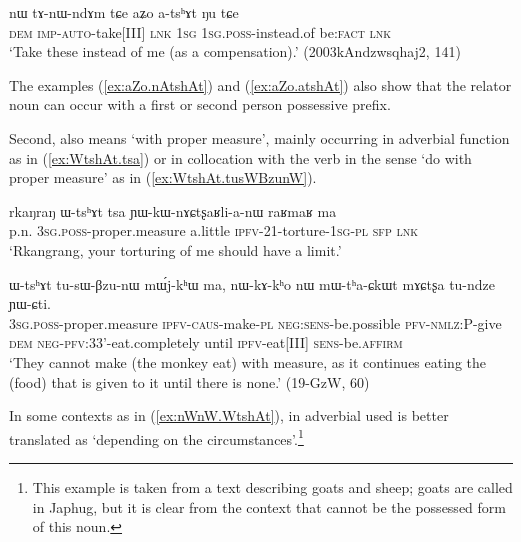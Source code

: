 \begin{exe}
\ex \label{ex:aZo.atshAt}
\gll nɯ tɤ-nɯ-ndɤm tɕe aʑo a-tsʰɤt ŋu tɕe \\
\textsc{dem} \textsc{imp}-\textsc{auto}-take[III] \textsc{lnk} \textsc{1sg} \textsc{1sg}.\textsc{poss}-instead.of be:\textsc{fact} \textsc{lnk} \\
\glt `Take these instead of me (as a compensation).' (2003kAndzwsqhaj2, 141)
\end{exe}

The examples (\ref{ex:aZo.nAtshAt}) and (\ref{ex:aZo.atshAt}) also show that the relator noun  can occur with a first or second person possessive prefix.

Second,  also means `with proper measure', mainly occurring in adverbial function as in (\ref{ex:WtshAt.tsa}) or in collocation with the verb  in the sense `do with proper measure' as in (\ref{ex:WtshAt.tusWBzunW}). 

\begin{exe}
\ex \label{ex:WtshAt.tsa}
\gll rkaŋraŋ ɯ-tsʰɤt tsa ɲɯ-kɯ-nɤɕtʂaʁli-a-nɯ raʁmaʁ ma  \\
p.n. \textsc{3sg}.\textsc{poss}-proper.measure a.little \textsc{ipfv}-2\fl{}1-torture-\textsc{1sg}-\textsc{pl} \textsc{sfp} \textsc{lnk}  \\
\glt `Rkangrang, your torturing of me should have a limit.' 
\end{exe}

\begin{exe}
\ex \label{ex:WtshAt.tusWBzunW}
\gll ɯ-tsʰɤt tu-sɯ-βzu-nɯ mɯ́j-kʰɯ ma, nɯ-kɤ-kʰo nɯ mɯ-tʰa-ɕkɯt mɤɕtʂa tu-ndze ɲɯ-ɕti. \\
\textsc{3sg}.\textsc{poss}-proper.measure \textsc{ipfv}-\textsc{caus}-make-\textsc{pl} \textsc{neg}:\textsc{sens}-be.possible \textsc{pfv}-\textsc{nmlz}:P-give \textsc{dem} \textsc{neg}-\textsc{pfv}:3\fl{}3'-eat.completely until \textsc{ipfv}-eat[III] \textsc{sens}-be.\textsc{affirm} \\
\glt `They cannot make (the monkey eat) with measure, as it continues eating the (food) that is given to it until there is none.' (19-GzW, 60)
\end{exe}

In some contexts as in (\ref{ex:nWnW.WtshAt}),  in adverbial used is better translated as `depending on the circumstances'.\footnote{This example is taken from a text describing goats and sheep; goats are called  in Japhug, but it is clear from the context that  cannot be the possessed form of this noun. }

